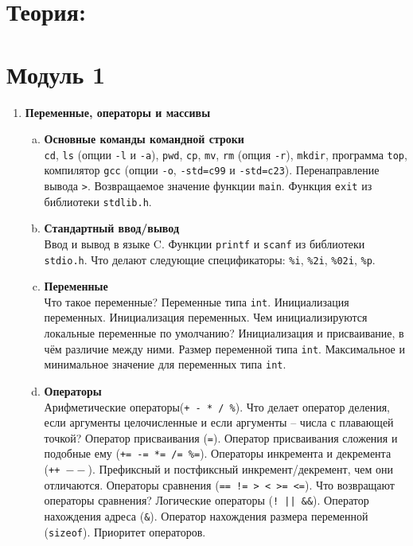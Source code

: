 \documentclass{article}
\begin{document}

\section*{Теория:}

\section*{Модуль 1}
\begin{enumerate}
\item \textbf{Переменные, операторы и массивы}

\begin{enumerate}[a.]
\item \textbf{Основные команды командной строки}\\
\texttt{cd}, \texttt{ls} (опции \texttt{-l} и \texttt{-a}), \texttt{pwd}, \texttt{cp}, \texttt{mv}, \texttt{rm} (опция \texttt{-r}), \texttt{mkdir}, программа \texttt{top}, компилятор \texttt{gcc} (опции \texttt{-o}, \texttt{-std=c99} и \texttt{-std=c23}). Перенаправление вывода \texttt{>}. Возвращаемое значение функции \texttt{main}. Функция \texttt{exit} из библиотеки \texttt{stdlib.h}.

\item \textbf{Стандартный ввод/вывод}\\
Ввод и вывод в языке C. Функции \texttt{printf} и \texttt{scanf} из библиотеки \texttt{stdio.h}.
Что делают следующие спецификаторы: \texttt{\%i}, \texttt{\%2i}, \texttt{\%02i}, \texttt{\%p}. 

\item \textbf{Переменные}\\
Что такое переменные? Переменные типа \texttt{int}. Инициализация переменных. Инициализация переменных. Чем инициализируются локальные переменные по умолчанию? Инициализация и присваивание, в чём различие между ними. Размер переменной типа \texttt{int}. Максимальное и минимальное значение для переменных типа \texttt{int}. 

\item \textbf{Операторы}\\
Арифметические операторы(\texttt{+ - * / \%}). Что делает оператор деления, если аргументы целочисленные и если аргументы -- числа с плавающей точкой? Оператор присваивания (\texttt{=}). Оператор присваивания сложения и подобные ему (\texttt{+= -= *= /= \%=}). Операторы инкремента и декремента (\texttt{++  $--$}). Префиксный  и постфиксный инкремент/декремент, чем они отличаются. Операторы сравнения (\texttt{== != > < >= <=}). Что возвращают операторы сравнения? Логические операторы (\texttt{!  ||  \&\&}). Оператор нахождения адреса (\texttt{\&}). Оператор нахождения размера переменной (\texttt{sizeof}). Приоритет операторов.


\end{enumerate}
\end{enumerate}
\end{document}
